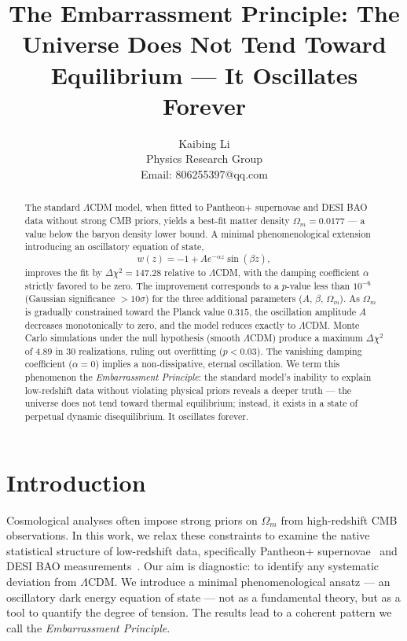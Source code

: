 \documentclass[10pt,a4paper,twocolumn]{article}
\begin{document}
\title{The Embarrassment Principle: The Universe Does Not Tend Toward Equilibrium — It Oscillates Forever}
\author{Kaibing Li\\
Physics Research Group\\
Email: 806255397@qq.com}
\date{}
\maketitle

\begin{abstract}
The standard $\Lambda$CDM model, when fitted to Pantheon+ supernovae and DESI BAO data without strong CMB priors, yields a best-fit matter density $\Omega_m = 0.0177$ — a value below the baryon density lower bound. A minimal phenomenological extension introducing an oscillatory equation of state,
\[
w(z) = -1 + A e^{-\alpha z}\sin(\beta z),
\]
improves the fit by $\Delta\chi^2 = 147.28$ relative to $\Lambda$CDM, with the damping coefficient $\alpha$ strictly favored to be zero. The improvement corresponds to a $p$-value less than $10^{-6}$ (Gaussian significance $>10\sigma$) for the three additional parameters ($A$, $\beta$, $\Omega_m$). As $\Omega_m$ is gradually constrained toward the Planck value $0.315$, the oscillation amplitude $A$ decreases monotonically to zero, and the model reduces exactly to $\Lambda$CDM. Monte Carlo simulations under the null hypothesis (smooth $\Lambda$CDM) produce a maximum $\Delta\chi^2$ of $4.89$ in 30 realizations, ruling out overfitting ($p<0.03$). The vanishing damping coefficient ($\alpha=0$) implies a non‑dissipative, eternal oscillation. We term this phenomenon the \emph{Embarrassment Principle}: the standard model's inability to explain low-redshift data without violating physical priors reveals a deeper truth — the universe does not tend toward thermal equilibrium; instead, it exists in a state of perpetual dynamic disequilibrium. It oscillates forever.
\end{abstract}

\section{Introduction}
Cosmological analyses often impose strong priors on $\Omega_m$ from high-redshift CMB observations. In this work, we relax these constraints to examine the native statistical structure of low-redshift data, specifically Pantheon+ supernovae~\cite{Scolnic2022} and DESI BAO measurements~\cite{DESI2024}. Our aim is diagnostic: to identify any systematic deviation from $\Lambda$CDM. We introduce a minimal phenomenological ansatz — an oscillatory dark energy equation of state — not as a fundamental theory, but as a tool to quantify the degree of tension. The results lead to a coherent pattern we call the \emph{Embarrassment Principle}.
\end{document}
